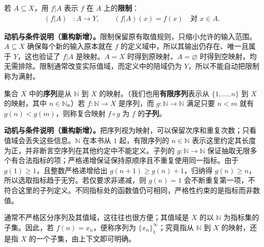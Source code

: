 \documentclass[../../main.tex]{subfiles}%
\begin{document}
\begin{definition}[映射的限制]\label{definition:ch00-mapping-restriction}
若 $A\subseteq X$，用 $f|A$ 表示 $f$ 在 $A$ 上的\textbf{限制}：
\begin{align*}
(f|A)&:A\to Y,\qquad (f|A)(x)=f(x)\quad\text{对 }x\in A.
\end{align*}
\end{definition}
\begin{remark}
\textbf{动机与条件说明（重构新增）。}限制保留原有取值规则，只缩小允许的输入范围。$A\subseteq X$ 确保每个新的输入原本就在 $f$ 的定义域中，所以其输出仍存在、唯一且属于 $Y$，这也验证了 $f|A$ 是映射。$A=X$ 时得到原映射，$A=\varnothing$ 时得到空映射，均无需排除。限制通常改变实际值域，而定义中的陪域仍为 $Y$，所以不能自动把限制称为满射。
\end{remark}



\begin{definition}[序列与子列]\label{definition:ch00-sequences-subsequences}
集合 $X$ 中的\textbf{序列}是从 $\mathbb{N}$ 到 $X$ 的映射。（我们也用\textbf{有限序列}表示从 $\{1,\ldots,n\}$ 到 $X$ 的映射，其中 $n\in\mathbb{N}$。）若 $f:\mathbb{N}\to X$ 是序列，而 $g:\mathbb{N}\to\mathbb{N}$ 满足只要 $n<m$ 就有 $g(n)<g(m)$，则称复合映射 $f\circ g$ 为 $f$ 的\textbf{子列}。
\end{definition}
\begin{remark}
\textbf{动机与条件说明（重构新增）。}把序列视为映射，可以保留次序和重复次数；只看值域会丢失这些信息。$\mathbb{N}$ 在本书从 $1$ 起，有限序列的 $n\in\mathbb{N}$ 表示这里约定其长度为正，并非断言空序列在其他约定中不能定义。子列的 $g:\mathbb{N}\to\mathbb{N}$ 保证抽取无限多个有合法指标的项；严格递增保证保持原顺序且不重复使用同一指标。由于 $g(1)\geqslant1$，且整数严格递增给出 $g(n+1)\geqslant g(n)+1$，归纳得 $g(n)\geqslant n$，所以选取指标趋于无穷。若仅要求非递减，则 $g(n)=1$ 会不断重复第一项，不符合这里的子列定义。不同指标处的函数值仍可相同，严格性约束的是指标而非数值。
\end{remark}


\begin{remark}
通常不严格区分序列及其值域，这往往也很方便；其值域是 $X$ 的以 $\mathbb{N}$ 为指标集的子集。因此，若 $f(n)=x_n$，便称序列为 $\{x_n\}_1^\infty$；究竟指从 $\mathbb{N}$ 到 $X$ 的映射，还是指 $X$ 的一个子集，由上下文即可明确。
\end{remark}
\end{document}
